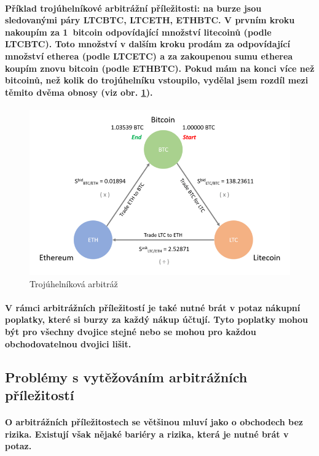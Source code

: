 \documentclass[thesis=B,czech]{FITthesis}[2019/03/21]
\begin{document}
\paragraph{
Příklad trojúhelníkové arbitrážní příležitosti: na burze jsou sledovanými páry LTCBTC, LTCETH, ETHBTC. V prvním kroku nakoupím za 1~bitcoin odpovídající množství litecoinů (podle LTCBTC). Toto množství v dalším kroku prodám za odpovídající množství etherea (podle LTCETC) a za zakoupenou sumu etherea koupím znovu bitcoin (podle ETHBTC). Pokud mám na konci více než bitcoinů, než kolik do trojúhelníku vstoupilo, vydělal jsem rozdíl mezi těmito dvěma obnosy (viz obr. \ref{triangle_arbitrage}).
}
\begin{figure}\centering
	\includegraphics[width=1\textwidth]{images/ZMENIT-triangle.png}
	\caption{Trojúhelníková arbitráž}\label{triangle_arbitrage}
\end{figure}
\paragraph{
V rámci arbitrážních příležitostí je také nutné brát v potaz nákupní poplatky, které si burzy za každý nákup účtují. Tyto poplatky mohou být pro všechny dvojice stejné nebo se mohou pro každou obchodovatelnou dvojici lišit.  
}
\subsection{Problémy s vytěžováním arbitrážních příležitostí}
\paragraph{
O arbitrážních příležitostech se většinou mluví jako o obchodech bez rizika. Existují však nějaké bariéry a rizika, která je nutné brát v potaz.
}
\end{document}
